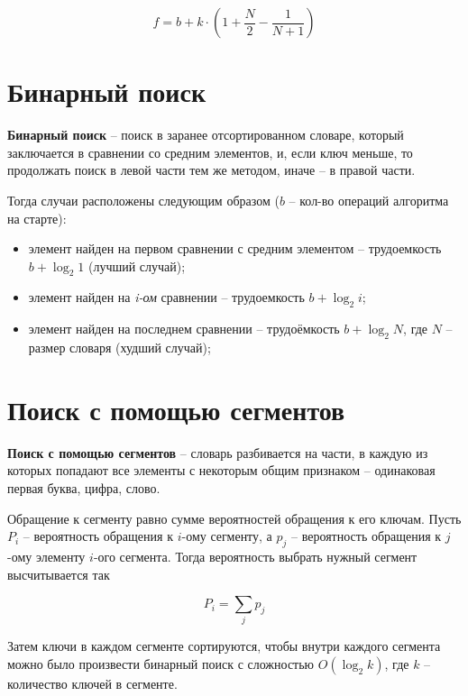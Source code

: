 \begin{equation}
	f = b + k \cdot \left(1 + \frac{N}{2} - \frac{1}{N + 1}\right)
\end{equation}


\section{Бинарный поиск}

\textbf{Бинарный поиск} \cite{search-bin} -- поиск в заранее отсортированном словаре, который заключается в сравнении со средним элементов, и, если ключ меньше, то продолжать поиск в левой части тем же методом, иначе -- в правой части.

Тогда случаи расположены следующим образом ($b$ -- кол-во операций алгоритма на старте):
\begin{itemize}
	\item элемент найден на первом сравнении с средним элементом -- трудоемкость $b + \log_2 1$ (лучший случай);
	\item элемент найден на \textit{i-ом} сравнении -- трудоемкость $b + \log_2 i$;
	\item элемент найден на последнем сравнении -- трудоёмкость $b +  \log_2 N$, где $N$ -- размер словаря (худший случай);
\end{itemize}



\section{Поиск с помощью сегментов}

\textbf{Поиск с помощью сегментов} \cite{search-segments} -- словарь разбивается на части, в каждую из которых попадают все элементы с некоторым общим признаком -- одинаковая первая буква, цифра, слово.

Обращение к сегменту равно сумме вероятностей обращения к его ключам. Пусть $P_i$ -- вероятность обращения к $i$-ому сегменту, а $p_j$ -- вероятность обращения к $j$-ому элементу $i$-ого сегмента. Тогда вероятность выбрать нужный сегмент высчитывается так 

\begin{equation}
	P_i = \sum_j p_j
\end{equation}

Затем ключи в каждом сегменте сортируются, чтобы внутри каждого сегмента можно было произвести бинарный поиск с сложностью $O(\log_2 k)$, где $k$ -- количество ключей в сегменте.

